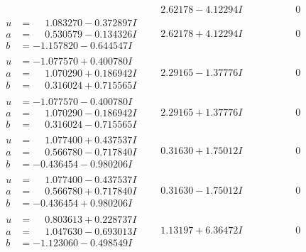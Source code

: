 \documentclass[1p]{elsarticle_modified}
\theoremstyle{definition}
\begin{document}
$$\begin{array}{c|c|c}
 & \phantom{-}2.62178 - 4.12294 I & \phantom{-0.000000 } 0 \\ \hline\begin{aligned}
u &= \phantom{-}1.083270 - 0.372897 I \\
a &= \phantom{-}0.530579 - 0.134326 I \\
b &= -1.157820 - 0.644547 I\end{aligned}
 & \phantom{-}2.62178 + 4.12294 I & \phantom{-0.000000 } 0 \\ \hline\begin{aligned}
u &= -1.077570 + 0.400780 I \\
a &= \phantom{-}1.070290 + 0.186942 I \\
b &= \phantom{-}0.316024 + 0.715565 I\end{aligned}
 & \phantom{-}2.29165 - 1.37776 I & \phantom{-0.000000 } 0 \\ \hline\begin{aligned}
u &= -1.077570 - 0.400780 I \\
a &= \phantom{-}1.070290 - 0.186942 I \\
b &= \phantom{-}0.316024 - 0.715565 I\end{aligned}
 & \phantom{-}2.29165 + 1.37776 I & \phantom{-0.000000 } 0 \\ \hline\begin{aligned}
u &= \phantom{-}1.077400 + 0.437537 I \\
a &= \phantom{-}0.566780 - 0.717840 I \\
b &= -0.436454 - 0.980206 I\end{aligned}
 & \phantom{-}0.31630 + 1.75012 I & \phantom{-0.000000 } 0 \\ \hline\begin{aligned}
u &= \phantom{-}1.077400 - 0.437537 I \\
a &= \phantom{-}0.566780 + 0.717840 I \\
b &= -0.436454 + 0.980206 I\end{aligned}
 & \phantom{-}0.31630 - 1.75012 I & \phantom{-0.000000 } 0 \\ \hline\begin{aligned}
u &= \phantom{-}0.803613 + 0.228737 I \\
a &= \phantom{-}1.047630 - 0.693013 I \\
b &= -1.123060 - 0.498549 I\end{aligned}
 & \phantom{-}1.13197 + 6.36472 I & \phantom{-0.000000 } 0 \\ \hline\begin{aligned}

\end{aligned}
\end{array}$$
\end{document}
